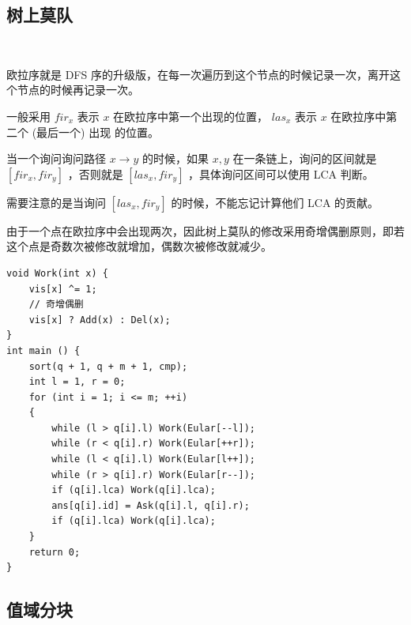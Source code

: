 \subsection{树上莫队}
~\\
\par \noindent 欧拉序就是 DFS 序的升级版，在每一次遍历到这个节点的时候记录一次，离开这个节点的时候再记录一次。
~\\
\par \noindent 一般采用 $fir_x$ 表示 $x$ 在欧拉序中第一个出现的位置， $l a s_x$ 表示 $x$ 在欧拉序中第二个 (最后一个) 出现 的位置。
~\\
\par \noindent 当一个询问询问路径 $x \rightarrow y$ 的时候，如果 $x, y$ 在一条链上，询问的区间就是 $[f i r_x, f i r_y]$ ，否则就是 $[l a s_x,fir_y]$ ，具体询问区间可以使用 LCA 判断。
~\\
\par \noindent 需要注意的是当询问 $\left[l a s_x, f i r_y\right]$ 的时候，不能忘记计算他们 LCA 的贡献。
~\\
\par \noindent 由于一个点在欧拉序中会出现两次，因此树上莫队的修改采用奇增偶删原则，即若这个点是奇数次被修改就增加，偶数次被修改就减少。
\begin{verbatim}
void Work(int x) {
    vis[x] ^= 1;
    // 奇增偶删
    vis[x] ? Add(x) : Del(x);
}
int main () {
    sort(q + 1, q + m + 1, cmp);
    int l = 1, r = 0;
    for (int i = 1; i <= m; ++i)
    {
        while (l > q[i].l) Work(Eular[--l]);
        while (r < q[i].r) Work(Eular[++r]);
        while (l < q[i].l) Work(Eular[l++]);
        while (r > q[i].r) Work(Eular[r--]);
        if (q[i].lca) Work(q[i].lca);
        ans[q[i].id] = Ask(q[i].l, q[i].r);
        if (q[i].lca) Work(q[i].lca);
    }
    return 0;
}
\end{verbatim}

\subsection{值域分块}

